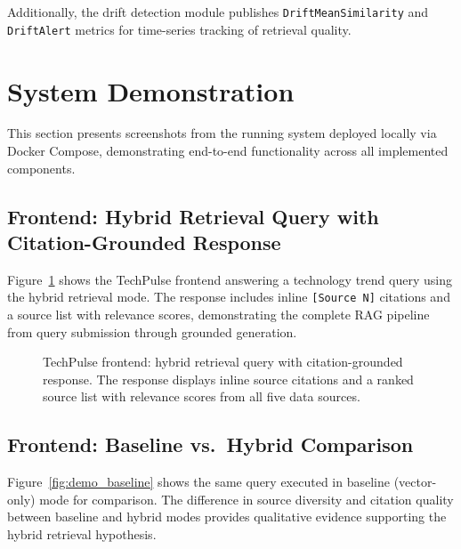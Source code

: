 \documentclass[12pt,a4paper]{report}
\begin{document}
Additionally, the drift detection module publishes \texttt{DriftMeanSimilarity} and \texttt{DriftAlert} metrics for time-series tracking of retrieval quality.

\section{System Demonstration}
\label{sec:demo}

This section presents screenshots from the running system deployed locally via Docker Compose, demonstrating end-to-end functionality across all implemented components.

\subsection{Frontend: Hybrid Retrieval Query with Citation-Grounded Response}

Figure~\ref{fig:demo_hybrid} shows the TechPulse frontend answering a technology trend query using the hybrid retrieval mode. The response includes inline \texttt{[Source N]} citations and a source list with relevance scores, demonstrating the complete RAG pipeline from query submission through grounded generation.

\begin{figure}[H]
\centering
{}
\caption{TechPulse frontend: hybrid retrieval query with citation-grounded response. The response displays inline source citations and a ranked source list with relevance scores from all five data sources.}
\label{fig:demo_hybrid}
\end{figure}

\subsection{Frontend: Baseline vs.\ Hybrid Comparison}

Figure~\ref{fig:demo_baseline} shows the same query executed in baseline (vector-only) mode for comparison. The difference in source diversity and citation quality between baseline and hybrid modes provides qualitative evidence supporting the hybrid retrieval hypothesis.
\end{document}
